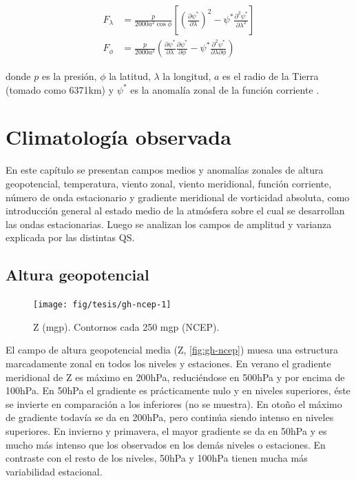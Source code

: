 \documentclass[spanish,a4paper,12pt,oneside]{book}
\begin{document}
\[
\begin{aligned}
F_\lambda &= \frac{p}{2000a^2\cos\phi}\left[ \left( \frac{\partial \psi^*}{\partial \lambda} \right)^2 - \psi^*\frac{\partial^2 \psi^*}{\partial \lambda^2}  \right] \\
F_\phi &= \frac{p}{2000a^2} \left( \frac{\partial \psi^*}{\partial \lambda}\frac{\partial \psi^*}{\partial \phi}  - \psi^* \frac{\partial^2 \psi^*}{\partial \lambda \partial \phi} \right) 
\end{aligned}
\]

donde \(p\) es la presión, \(\phi\) la latitud, \(\lambda\) la longitud,
\(a\) es el radio de la Tierra (tomado como 6371km) y \(\psi^*\) es la
anomalía zonal de la función corriente \citep{Vera2004}.

\hypertarget{climatologia-observada}{%
\chapter{Climatología observada}\label{climatologia-observada}}

En este capítulo se presentan campos medios y anomalías zonales de
altura geopotencial, temperatura, viento zonal, viento meridional,
función corriente, número de onda estacionario y gradiente meridional de
vorticidad absoluta, como introducción general al estado medio de la
atmósfera sobre el cual se desarrollan las ondas estacionarias. Luego se
analizan los campos de amplitud y varianza explicada por las distintas
QS.

\hypertarget{altura-geopotencial}{%
\section{Altura geopotencial}\label{altura-geopotencial}}

\begin{landscape}\begin{figure}

{\centering \texttt{[image: fig/tesis/gh-ncep-1]} 

}

\caption{Z (mgp). Contornos cada 250 mgp (NCEP).}\label{fig:gh-ncep}
\end{figure}
\end{landscape}

El campo de altura geopotencial media (Z, \autoref{fig:gh-ncep}) muesa
una estructura marcadamente zonal en todos los niveles y estaciones. En
verano el gradiente meridional de Z es máximo en 200hPa, reduciéndose en
500hPa y por encima de 100hPa. En 50hPa el gradiente es prácticamente
nulo y en niveles superiores, éste se invierte en comparación a los
inferiores (no se muestra). En otoño el máximo de gradiente todavía se
da en 200hPa, pero continúa siendo intenso en niveles superiores. En
invierno y primavera, el mayor gradiente se da en 50hPa y es mucho más
intenso que los observados en los demás niveles o estaciones. En
contraste con el resto de los niveles, 50hPa y 100hPa tienen mucha más
variabilidad estacional.
\end{document}
